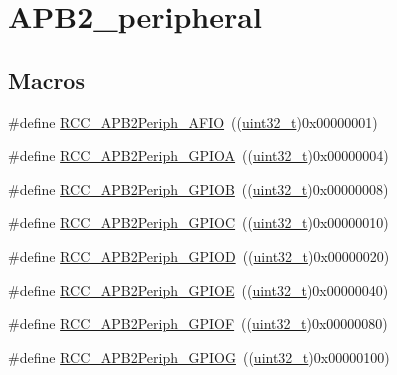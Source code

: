 \hypertarget{group___a_p_b2__peripheral}{}\section{A\+P\+B2\+\_\+peripheral}
\label{group___a_p_b2__peripheral}
\subsection*{Macros}
\begin{DoxyCompactItemize}
\item 
\#define \hyperlink{group___a_p_b2__peripheral_ga5aa9469879ffa019d4836b0d297104c5}{R\+C\+C\+\_\+\+A\+P\+B2\+Periph\+\_\+\+A\+F\+IO}~((\hyperlink{_p_e___types_8h_a33594304e786b158f3fb30289278f5af}{uint32\+\_\+t})0x00000001)
\item 
\#define \hyperlink{group___a_p_b2__peripheral_ga44b92fbf2e288796b1acbce2708f3636}{R\+C\+C\+\_\+\+A\+P\+B2\+Periph\+\_\+\+G\+P\+I\+OA}~((\hyperlink{_p_e___types_8h_a33594304e786b158f3fb30289278f5af}{uint32\+\_\+t})0x00000004)
\item 
\#define \hyperlink{group___a_p_b2__peripheral_ga8c8909c3640508e9ce31dff80010a6dd}{R\+C\+C\+\_\+\+A\+P\+B2\+Periph\+\_\+\+G\+P\+I\+OB}~((\hyperlink{_p_e___types_8h_a33594304e786b158f3fb30289278f5af}{uint32\+\_\+t})0x00000008)
\item 
\#define \hyperlink{group___a_p_b2__peripheral_gaf1f4b467becee1ff31ba2c54328a0115}{R\+C\+C\+\_\+\+A\+P\+B2\+Periph\+\_\+\+G\+P\+I\+OC}~((\hyperlink{_p_e___types_8h_a33594304e786b158f3fb30289278f5af}{uint32\+\_\+t})0x00000010)
\item 
\#define \hyperlink{group___a_p_b2__peripheral_ga177200a365084af306e98389edeba42b}{R\+C\+C\+\_\+\+A\+P\+B2\+Periph\+\_\+\+G\+P\+I\+OD}~((\hyperlink{_p_e___types_8h_a33594304e786b158f3fb30289278f5af}{uint32\+\_\+t})0x00000020)
\item 
\#define \hyperlink{group___a_p_b2__peripheral_gabc736c9892278ccd15848c6137d991fc}{R\+C\+C\+\_\+\+A\+P\+B2\+Periph\+\_\+\+G\+P\+I\+OE}~((\hyperlink{_p_e___types_8h_a33594304e786b158f3fb30289278f5af}{uint32\+\_\+t})0x00000040)
\item 
\#define \hyperlink{group___a_p_b2__peripheral_ga2dbb1e1116b57621c585e1b52c894bda}{R\+C\+C\+\_\+\+A\+P\+B2\+Periph\+\_\+\+G\+P\+I\+OF}~((\hyperlink{_p_e___types_8h_a33594304e786b158f3fb30289278f5af}{uint32\+\_\+t})0x00000080)
\item 
\#define \hyperlink{group___a_p_b2__peripheral_gaba82756d2060b97c62eb555242361b2e}{R\+C\+C\+\_\+\+A\+P\+B2\+Periph\+\_\+\+G\+P\+I\+OG}~((\hyperlink{_p_e___types_8h_a33594304e786b158f3fb30289278f5af}{uint32\+\_\+t})0x00000100)

\end{DoxyCompactItemize}
